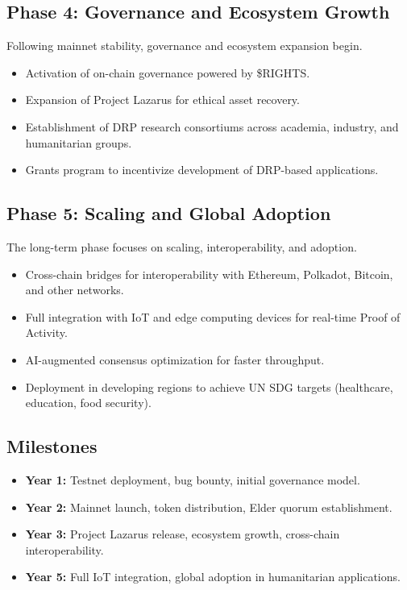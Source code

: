 \documentclass[11pt,a4paper]{article}
\begin{document}
\subsection{Phase 4: Governance and Ecosystem Growth}
Following mainnet stability, governance and ecosystem expansion begin.
\begin{itemize}
    \item Activation of on-chain governance powered by \$RIGHTS.
    \item Expansion of Project Lazarus for ethical asset recovery.
    \item Establishment of DRP research consortiums across academia, industry, and humanitarian groups.
    \item Grants program to incentivize development of DRP-based applications.
\end{itemize}

\subsection{Phase 5: Scaling and Global Adoption}
The long-term phase focuses on scaling, interoperability, and adoption.
\begin{itemize}
    \item Cross-chain bridges for interoperability with Ethereum, Polkadot, Bitcoin, and other networks.
    \item Full integration with IoT and edge computing devices for real-time Proof of Activity.
    \item AI-augmented consensus optimization for faster throughput.
    \item Deployment in developing regions to achieve UN SDG targets (healthcare, education, food security).
\end{itemize}

\subsection{Milestones}
\begin{itemize}
    \item \textbf{Year 1:} Testnet deployment, bug bounty, initial governance model.
    \item \textbf{Year 2:} Mainnet launch, token distribution, Elder quorum establishment.
    \item \textbf{Year 3:} Project Lazarus release, ecosystem growth, cross-chain interoperability.
    \item \textbf{Year 5:} Full IoT integration, global adoption in humanitarian applications.
\end{itemize}
\end{document}
